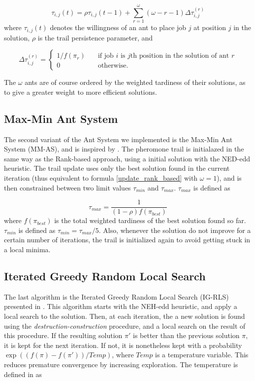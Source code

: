 \documentclass[runningheads]{llncs}
\begin{document}
\begin{equation}
	\label{update_rank_based}
	\tau_{i,j}(t)=\rho\tau_{i,j}(t-1)+\sum_{r=1}^\omega(\omega-r-1)\Delta\tau_{i,j}^{(r)}
\end{equation}
where $\tau_{i,j}(t)$ denotes the willingness of an ant to place job $j$ at position
$j$ in the solution, $\rho$ is the trail persistence parameter, and

\begin{equation}
	\Delta\tau_{i,j}^{(r)}=
		\begin{cases}
			1/f(\pi_r)\quad&\text{if job }i\text{ is }j\text{th position in the solution of ant } r\\
			0 \quad&\text{otherwise.}
		\end{cases}
\end{equation}

The $\omega$ ants are of course ordered by the weighted tardiness of their
solutions, as to give a greater weight to more efficient solutions.

\subsection{Max-Min Ant System}

The second variant of the Ant System we implemented is the Max-Min Ant System
(MM-AS), and is inspired by \cite{stutzle1998ant}. The pheromone trail is
initialazed in the same way as the Rank-based approach, using a initial solution
with the NED-edd heuristic. The trail update uses only the best solution found
in the current iteration (thus equivalent to formula \ref{update_rank_based}
with $\omega=1$), and is then constrained between two limit values $\tau_{min}$
and $\tau_{max}$. $\tau_{max}$ is defined as

\begin{equation}
	\tau_{max}=\frac{1}{(1-\rho)f(\pi_{best})}
\end{equation}
where $f(\pi_{best})$ is the total weighted tardiness of the best solution found
so far. $\tau_{min}$ is defined as $\tau_{min}=\tau_{max}/5$. Also, whenever
the solution do not improve for a certain number of iterations, the trail is
initialized again to avoid getting stuck in a local minima.

\subsection{Iterated Greedy Random Local Search}

The last algorithm is the Iterated Greedy Random Local Search (IG-RLS) presented
in \cite{karabulut2016hybrid}. This algorithm starts with the NEH-edd heuristic,
and apply a local search to the solution. Then, at each iteration, the a new
solution is found using the \emph{destruction-construction} procedure, and a
local search on the result of this procedure. If the resulting solution $\pi'$
is better than the previous solution $\pi$, it is kept for the next iteration.
If not, it is nonetheless kept with a probability $\exp((f(\pi) - f(\pi')) /
Temp)$, where $Temp$ is a temperature variable. This reduces premature
convergence by increasing exploration. The temperature is defined in
\cite{karabulut2016hybrid} as
\end{document}
